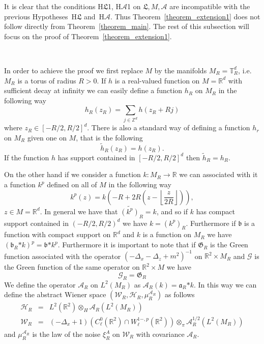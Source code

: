 \documentclass[a4paper,10pt]{article}
\newcommand{\asterisk}{\mathord{*}}
\begin{document}
It is clear that the conditions H$\mathfrak{L}$1, H$\mathcal{A}$1 on
$\mathfrak{L}, M, \mathcal{A}$ are incompatible with the previous
Hypotheses~H$\mathfrak{L}$ and~H$\mathcal{A}$. Thus
Theorem~\ref{theorem_extension1} does not follow directly from
Theorem~\ref{theorem_main}. The rest of this subsection will focus on the
proof of Theorem~\ref{theorem_extension1}.

\

In order to achieve the proof we first replace $M$ by the manifolds $M_R
=\mathbb{T}^d_R$, i.e. $M_R$ is a torus of radius $R > 0$. If $h$ is a
real-valued function on $M =\mathbb{R}^d$ with sufficient decay at infinity we
can easily define a function $h_R$ on $M_R$ in the following way
\[ h_R (z_R) = \sum_{j \in \mathbb{Z}^d} h (z_R + R j) \]
where $z_R \in [- R / 2, R / 2]^d$. There is also a standard way of defining a
function $h_r$ on $M_R$ given one on $M$, that is the following
\[ \tilde{h}_R (z_R) = h (z_R) . \]
If the function $h$ has support contained in $[- R / 2, R / 2]^d$ then
$\tilde{h}_R = h_R$.

On the other hand if we consider a function $k : M_R \rightarrow \mathbb{R}$
we can associated with it a function $k^p$ defined on all of $M$ in the
following way
\[ k^p (z) = k \left( - R + 2 R \left( z - \left\lfloor \frac{z}{2 R}
   \right\rfloor \right) \right), \]
$z \in M =\mathbb{R}^d$. In general we have that $\widetilde{(k^p)}_R = k$,
and so if $k$ has compact support contained in $(- R / 2, R / 2)^d$ we have $k
= (k^p)_R$. Furthermore if $\mathfrak{b}$ is a function with compact support
on $\mathbb{R}^d$ and $k$ is a function on $M_R$ we have $(\mathfrak{b}_R
\asterisk k)^p = \mathfrak{b} \asterisk k^p$. Furthermore it is important to
note that if $\mathfrak{G}_R$ is the Green function associated with the
operator $(- \Delta_x - \Delta_z + m^2)^{- 1}$ on $\mathbb{R}^2 \times M_R$
and $\mathcal{G}$ is the Green function of the same operator on $\mathbb{R}^2
\times M$ we have
\[ \mathcal{G}_R = \mathfrak{G}_R \]
We define the operator $\mathcal{A}_R$ on $L^2 (M_R)$ as $\mathcal{A}_R (k) =
\mathfrak{a}_R \asterisk k$. In this way we can define the abstract Wiener
space $(\mathcal{W}_R, \mathcal{H}_R, \mu^{\mathcal{A}_R}_R)$ as follows
\begin{eqnarray}
  \mathcal{H}_R & = & L^2 (\mathbb{R}^2) \otimes_H \mathcal{A}_R (L^2 (M_R))
  \nonumber\\
  \mathcal{W}_R & = & (- \Delta_x + 1) (C^0_{\ell} (\mathbb{R}^2) \cap W^{1 -,
  p}_{\ell} (\mathbb{R}^2)) \otimes_{\pi} \mathcal{A}_R^{1 / 2} (L^2 (M_R))
  \nonumber
\end{eqnarray}
and $\mu^{\mathcal{A}_R}_R$ is the law of the noise $\xi^A_R$ on
$\mathcal{W}_R$ with covariance $\mathcal{A}_R$.
\end{document}
